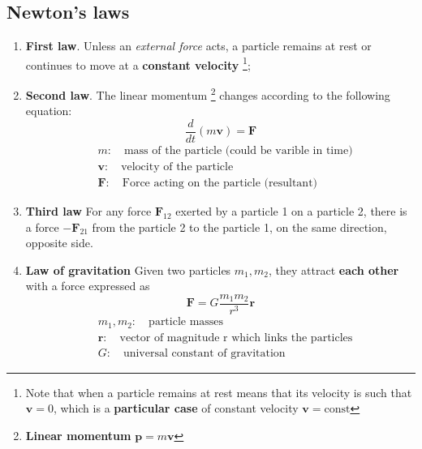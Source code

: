 \subsection{Newton's laws}
\begin{enumerate}
    \item \textsf{\textbf{First law}}. Unless an \textit{external force} acts, a particle remains at rest or continues to move at a \textbf{constant velocity}
    \footnote[1]{Note that when a particle remains at rest means that its velocity is such that $\mathbf{v}=0$, which is a \textbf{particular case} of constant velocity $\mathbf{v}=\text{const}$}; 
    \item \textsf{\textbf{Second law}}. The linear momentum {\footnote[2]{\textbf{Linear momentum} $\mathbf{p}=m\mathbf{v}$}} changes according to the following equation: 
    \begin{equation*}
        \frac{d}{dt}(m\mathbf{v}) = \textbf{F}
    \end{equation*}
    \begin{align*}
        &m: \quad \text{mass of the particle (could be varible in time)}\\
        &\mathbf{v}: \quad \text{velocity of the particle}\\
        &\mathbf{F}: \quad \text{Force acting on the particle (resultant)}
    \end{align*}
    \item \textsf{\textbf{Third law}} For any force $\mathbf{F}_{12}$ exerted by a particle 1 on a particle 2, there is a force $-\mathbf{F}_{21}$ from the particle 2 to the particle 1, on the same direction, opposite side.
    \item \textsf{\textbf{Law of gravitation}} Given two particles $m_1, m_2$, they attract \textbf{each other} with a force expressed as
    \begin{equation*}
        \mathbf{F} = G\frac{m_1m_2}{r^3}\mathbf{r}
    \end{equation*}
    \begin{align*}
        &m_1, m_2: \quad \text{particle masses}\\
        &\mathbf{r}: \quad  \text{vector of magnitude r which links the particles}\\
        &G: \quad \text{universal constant of gravitation}
    \end{align*}
\end{enumerate}

